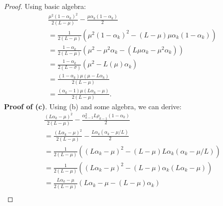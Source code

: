 \documentclass[12pt]{article}
\begin{document}
\begin{proof}
            Using basic algebra: 
            {\allowdisplaybreaks
            \begin{align*}
                & \frac{\mu^2(1 - \alpha_k)^2}{2(L - \mu)} 
                - \frac{\mu\alpha_k(1 - \alpha_k)}{2}
                \\
                &= 
                \frac{1}{2\left(L - \mu\right)}
                \left(
                    \mu^2(1 - \alpha_k)^2
                    - \left(L - \mu\right)\mu \alpha_k(1 - \alpha_k)
                \right)
                \\
                &= \frac{1 - \alpha_k}{2\left(L - \mu\right)}\left(
                    \mu^2 
                    - \mu^2\alpha_k 
                    - \left(L \mu \alpha_k - \mu^2 \alpha_k\right)
                \right)
                \\
                &= 
                \frac{1 - \alpha_k}{2(L - \sigma)}\left(
                    \mu^2 - L\left(\mu\right)\alpha_k
                \right)
                \\
                &= 
                \frac{(1 - \alpha_k)\mu\left(\mu - L\alpha_k\right)}
                {2\left(L - \mu\right)}
                \\
                &= \frac{(\alpha_k - 1)\mu\left(L\alpha_k - \mu\right)}
                {2\left(L - \mu\right)}. 
            \end{align*}
            }
            \textbf{Proof of (c)}. 
            Using (b) and some algebra, we can derive: 
            {\allowdisplaybreaks
            \begin{align*}
                & \frac{(L\alpha_k - \mu)^2}{2(L - \mu)} - \frac{\alpha_{k - 1}^2 L \rho_{k - 1}(1 - \alpha_k)}{2}
                \\
                &= \frac{(L\alpha_k - \mu)^2}{2(L - \mu)} - \frac{L\alpha_k(\alpha_k - \mu/L)}{2}
                \\
                &= \frac{1}{2(L - \mu)}\left(
                    (L\alpha_k - \mu)^2 - (L - \mu)L\alpha_k(\alpha_k - \mu/L)
                \right)
                \\
                &= 
                \frac{1}{2(L - \mu)}\left(
                    (L\alpha_k - \mu)^2 - (L - \mu)\alpha_k(L\alpha_k - \mu)
                \right)
                \\
                &= \frac{L\alpha_k - \mu}{2(L - \mu)}\left(
                    L\alpha_k - \mu - (L - \mu)\alpha_k
                \right)
                \\

\end{align*}}
\end{proof}
\end{document}
